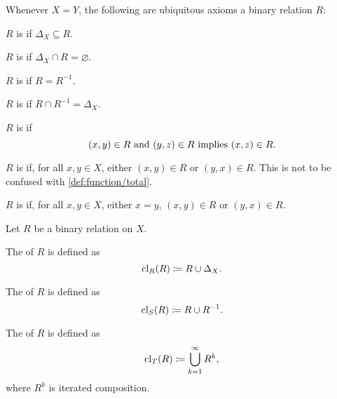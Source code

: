 \begin{definition}
  Whenever \( X = Y \), the following are ubiquitous axioms a binary relation \( R \):
  \begin{defenum}[resume=def:binary_relation]
     \( R \) is  if \( \Delta_X \subseteq R \).

     \( R \) is  if \( \Delta_X \cap R = \varnothing \).

     \( R \) is  if \( R = R^{-1} \).

     \( R \) is  if \( R \cap R^{-1} = \Delta_X \).

     \( R \) is  if
    \begin{equation*}
      (x, y) \in R \text{ and } (y, z) \in R \text{ implies } (x, z) \in R.
    \end{equation*}

     \( R \) is  if, for all \( x, y \in X \), either \( (x, y) \in R \) or \( (y, x) \in R \). This is not to be confused with \cref{def:function/total}.

     \( R \) is  if, for all \( x, y \in X \), either \( x = y \), \( (x, y) \in R \) or \( (y, x) \in R \).
  \end{defenum}
\end{definition}

\begin{definition}\label{def:derived_relations}
  Let \( R \) be a binary relation on \( X \).

  \begin{defenum}
     The  of \( R \) is defined as
    \begin{equation*}
      \operatorname{cl}_R(R) \coloneqq R \cup \Delta_X.
    \end{equation*}

     The  of \( R \) is defined as
    \begin{equation*}
      \operatorname{cl}_S(R) \coloneqq R \cup R^{-1}.
    \end{equation*}

     The  of \( R \) is defined as
    \begin{equation*}
      \operatorname{cl}_T(R) \coloneqq \bigcup_{k=1}^\infty R^k,
    \end{equation*}
    where \( R^k \) is iterated composition.
  \end{defenum}
\end{definition}

